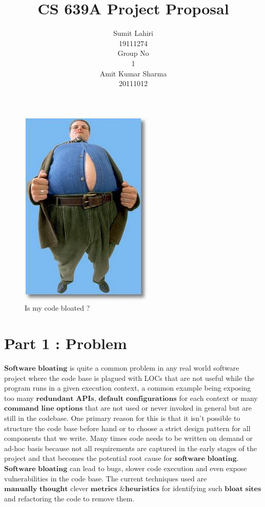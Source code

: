 \documentclass{article} %
\title{CS 639A Project Proposal}
\author{
Sumit Lahiri \\
19111274 \\
\And
Group No\\
1\\
\And
Amit Kumar Sharma \\
20111012\\
}
\begin{document}
\maketitle

\begin{figure}[htbp]
\centerline{\includegraphics[scale=0.3]{bloat.jpg}}
\caption{Is my code bloated ?}
\label{fig}
\end{figure}

\section*{Part 1 : Problem}
$\textbf{Software bloating}$ is quite a common problem in any real world software project where the code base is plagued with LOCs that are not useful while the program runs in a given execution context, a common example being exposing too many $\textbf{redundant APIs}$, $\textbf{default configurations}$ for each context or many $\textbf{command line options}$ that are not used or never invoked in general but are still in the codebase. One primary reason for this is that it isn't possible to structure the code base before hand or to choose a strict design pattern for all components that we write. Many times code needs to be written on demand or ad-hoc basis because not all requirements are captured in the early stages of the project and that becomes the potential root cause for $\textbf{software bloating}$. $\textbf{Software bloating}$ can lead to bugs, slower code execution and even expose vulnerabilities in the code base. The current techniques used are $\textbf{manually thought}$ clever $\textbf{metrics \& heuristics}$ for identifying such $\textbf{bloat sites}$ and refactoring the code to remove them. 
\end{document}
